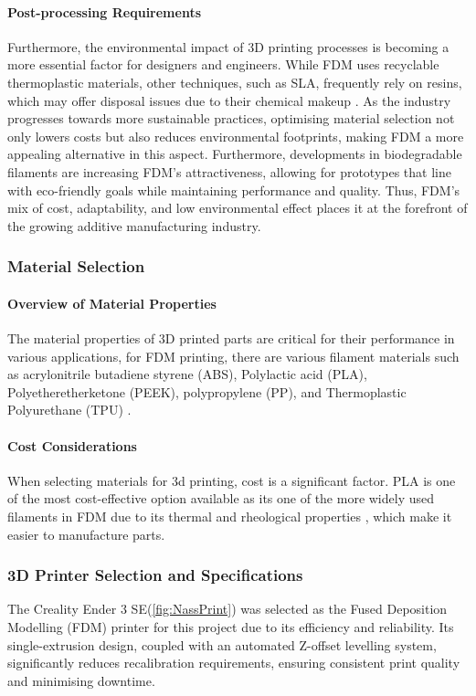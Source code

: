 \paragraph{Post-processing Requirements}

Furthermore, the environmental impact of 3D printing processes is becoming a more essential factor for designers and engineers. 
While FDM uses recyclable thermoplastic materials, other techniques, such as SLA, frequently rely on resins, which may offer disposal issues due to their chemical makeup \cite{RefWorks:yankov2017comparison}. 
As the industry progresses towards more sustainable practices, optimising material selection not only lowers costs but also reduces environmental footprints, making FDM a more appealing alternative in this aspect. 
Furthermore, developments in biodegradable filaments are increasing FDM's attractiveness, allowing for prototypes that line with eco-friendly goals while maintaining performance and quality. 
Thus, FDM's mix of cost, adaptability, and low environmental effect places it at the forefront of the growing additive manufacturing industry.

\subsubsection{Material Selection}
\paragraph{Overview of Material Properties}
The material properties of 3D printed parts are critical for their performance in various applications, for FDM printing, there are various filament materials such as acrylonitrile butadiene styrene (ABS), Polylactic acid (PLA), Polyetheretherketone (PEEK), polypropylene (PP), and Thermoplastic Polyurethane (TPU) \cite{RefWorks:RefID:89-rajan2022fused}.

\paragraph{Cost Considerations}

When selecting materials for 3d printing, cost is a significant factor. 
PLA is one of the most cost-effective option available as its one of the more widely used filaments in FDM due to its thermal and rheological properties \cite{RefWorks:RefID:89-rajan2022fused}, which make it easier to manufacture parts.

\subsubsection{3D Printer Selection and Specifications}
The Creality Ender 3 SE(\ref{fig:NassPrint}) was selected as the Fused Deposition Modelling (FDM) printer for this project due to its efficiency and reliability. 
Its single-extrusion design, coupled with an automated Z-offset levelling system, significantly reduces recalibration requirements, ensuring consistent print quality and minimising downtime. 

